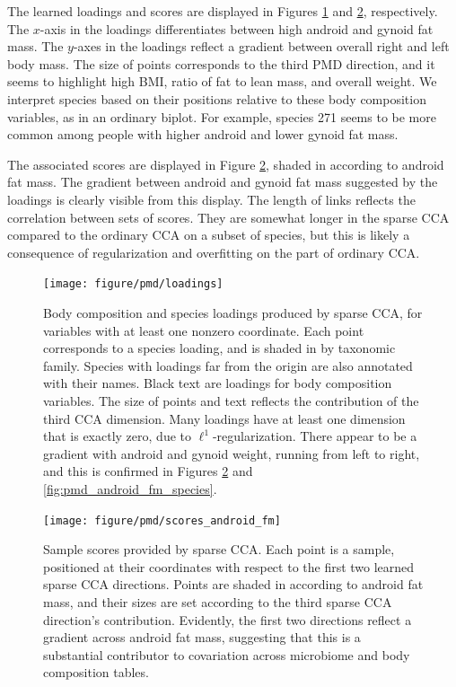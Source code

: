 \documentclass{article}
\begin{document}
The learned loadings and scores are displayed in Figures \ref{fig:pmd_loadings}
and \ref{fig:pmd_scores_android_fm}, respectively. The $x$-axis in the loadings
differentiates between high android and gynoid fat mass. The $y$-axes in the
loadings reflect a gradient between overall right and left body mass. The size
of points corresponds to the third PMD direction, and it seems to highlight high
BMI, ratio of fat to lean mass, and overall weight. We interpret species
based on their positions relative to these body composition variables, as in an
ordinary biplot. For example, species 271 seems to be more common among people
with higher android and lower gynoid fat mass.

The associated scores are displayed in Figure \ref{fig:pmd_scores_android_fm},
shaded in according to android fat mass. The gradient between android and gynoid
fat mass suggested by the loadings is clearly visible from this display. The
length of links reflects the correlation between sets of scores. They are
somewhat longer in the sparse CCA compared to the ordinary CCA on a subset of
species, but this is likely a consequence of regularization and overfitting on
the part of ordinary CCA.

\begin{figure}
  \centering
  \texttt{[image: figure/pmd/loadings]}
  \caption{
    Body composition and species loadings produced by sparse CCA, for variables
    with at least one nonzero coordinate. Each point corresponds to a species
    loading, and is shaded in by taxonomic family. Species with loadings far
    from the origin are also annotated with their names. Black text are loadings
    for body composition variables. The size of points and text reflects the
    contribution of the third CCA dimension. Many loadings have at least one
    dimension that is exactly zero, due to $\ell^{1}$-regularization. There
    appear to be a gradient with android and gynoid weight, running from left to
    right, and this is confirmed in Figures \ref{fig:pmd_scores_android_fm} and
    \ref{fig:pmd_android_fm_species}.
    \label{fig:pmd_loadings}
  }
\end{figure}

\begin{figure}
  \centering
  \texttt{[image: figure/pmd/scores\_android\_fm]}
  \caption{
    Sample scores provided by sparse CCA. Each point is a sample, positioned at
    their coordinates with respect to the first two learned sparse CCA
    directions. Points are shaded in according to android fat mass, and their
    sizes are set according to the third sparse CCA direction's contribution.
    Evidently, the first two directions reflect a gradient across android fat
    mass, suggesting that this is a substantial contributor to covariation
    across microbiome and body composition tables.
    \label{fig:pmd_scores_android_fm}
  }
\end{figure}
\end{document}
